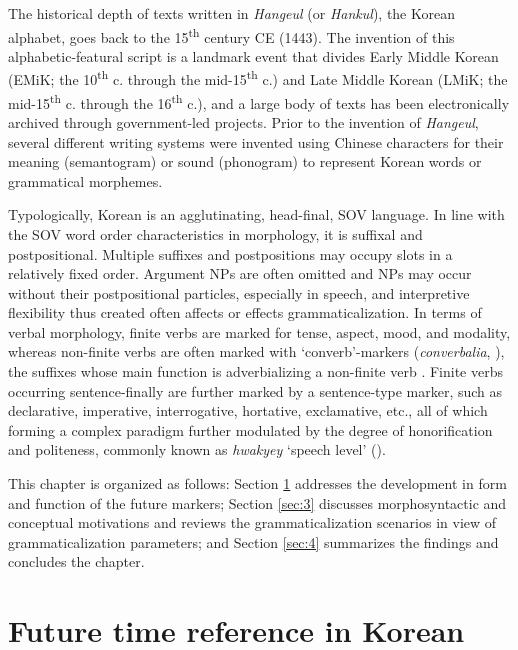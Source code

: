 \documentclass[output=paper,colorlinks,citecolor=brown]{langscibook}
\begin{document}
The historical depth of texts written in \textit{Hangeul }(or \textit{Hankul}), the Korean alphabet, goes back to the 15\textsuperscript{th} century CE (1443). The invention of this alphabetic-featural script is a landmark event that divides Early Middle Korean (EMiK; the 10\textsuperscript{th} c. through the mid-15\textsuperscript{th} c.) and Late Middle Korean (LMiK; the mid-15\textsuperscript{th} c. through the 16\textsuperscript{th} c.), and a large body of texts has been electronically archived through government-led projects. Prior to the invention of \textit{Hangeul}, several different writing systems were invented using Chinese characters for their meaning (semantogram) or sound (phonogram) to represent Korean words or grammatical morphemes. 

\largerpage[0.5]

Typologically, Korean is an agglutinating, head-final, SOV language. In line with the SOV word order characteristics in morphology, it is suffixal and postpositional. Multiple suffixes and postpositions may occupy slots in a relatively fixed order. Argument NPs are often omitted and NPs may occur without their postpositional particles, especially in speech, and interpretive flexibility thus created often affects or effects grammaticalization. In terms of verbal morphology, finite verbs are marked for tense, aspect, mood, and modality, whereas non-finite verbs are often marked with ‘converb’-markers (\textit{converbalia}, \cite{Ramstedt1903}), the suffixes whose main function is adverbializing a non-finite verb \citep[][]{haspelmath1995converb}. Finite verbs occurring sentence-finally are further marked by a sentence-type marker, such as declarative, imperative, interrogative, hortative, exclamative, etc., all of which forming a complex paradigm further modulated by the degree of honorification and politeness, commonly known as \textit{hwakyey }‘speech level’ (\cite{Rhee2020}).

This chapter is organized as follows: Section \ref{sec:2} addresses the development in form and function of the future markers; Section \ref{sec:3} discusses morphosyntactic and conceptual motivations and reviews the grammaticalization scenarios in view of grammaticalization parameters; and Section \ref{sec:4} summarizes the findings and concludes the chapter.


\section{Future time reference in Korean} \label{sec:2}
\end{document}

